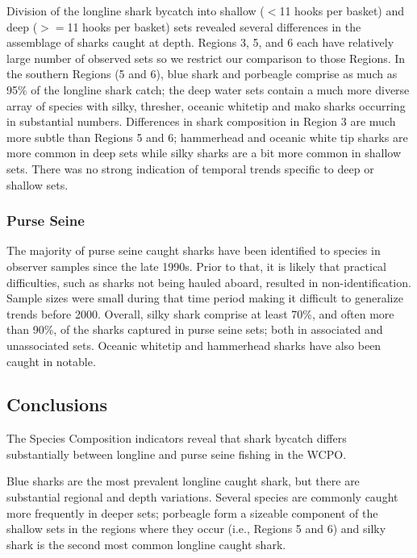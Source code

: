 \documentclass[12pt]{SCreport}
\begin{document}
Division of the longline shark bycatch into shallow ($<$11 hooks per basket) and deep ($>=$11 hooks per basket) sets revealed several differences in the assemblage of sharks caught at depth.  Regions 3, 5, and 6 each have relatively large number of observed sets so we restrict our comparison to those Regions.  In the southern Regions (5 and 6), blue shark and porbeagle comprise as much as 95\% of the longline shark catch; the deep water sets contain a much more diverse array of species with silky, thresher, oceanic whitetip and mako sharks occurring in substantial numbers.  Differences in shark composition in Region 3 are much more subtle than Regions 5 and 6; hammerhead and oceanic white tip sharks are more common in deep sets while silky sharks are a bit more common in shallow sets. There was no strong indication of temporal trends specific to deep or shallow sets.

  
 \subsubsection{Purse Seine} 
The majority of purse seine caught sharks have been identified to species in observer samples since the late 1990s.  Prior to that, it is likely that practical difficulties, such as sharks not being hauled aboard, resulted in non-identification.  Sample sizes were small during that time period making it difficult to generalize trends before 2000.  Overall, silky shark comprise at least 70\%, and often more than 90\%, of the sharks captured in purse seine sets; both in associated and unassociated sets.  Oceanic whitetip and hammerhead sharks have also been caught in notable.

 
\subsection{Conclusions}

The Species Composition indicators reveal that shark bycatch differs substantially between longline and purse seine fishing in the WCPO.  

Blue sharks are the most prevalent longline caught shark, but there are substantial regional and depth variations.  Several species are commonly caught more frequently in deeper sets; porbeagle form a sizeable component of the shallow sets in the regions where they occur (i.e., Regions 5 and 6) and silky shark is the second most common longline caught shark.
\end{document}
